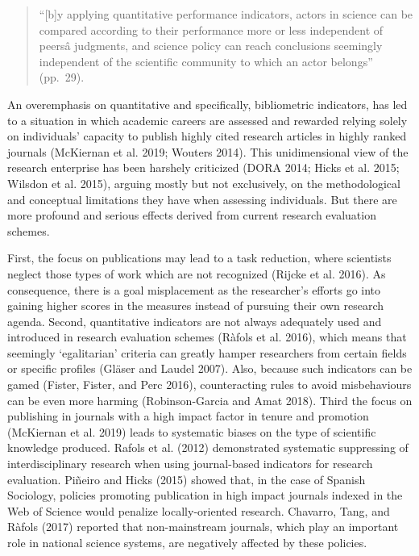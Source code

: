 \documentclass[]{elsarticle} %
\begin{document}
\begin{quote}
``{[}b{]}y applying quantitative performance indicators, actors in
science can be compared according to their performance more or less
independent of peersâ judgments, and science policy can reach
conclusions seemingly independent of the scientific community to which
an actor belongs'' (pp.~29).
\end{quote}

An overemphasis on quantitative and specifically, bibliometric
indicators, has led to a situation in which academic careers are
assessed and rewarded relying solely on individuals' capacity to publish
highly cited research articles in highly ranked journals (McKiernan et
al. 2019; Wouters 2014). This unidimensional view of the research
enterprise has been harshely criticized (DORA 2014; Hicks et al. 2015;
Wilsdon et al. 2015), arguing mostly but not exclusively, on the
methodological and conceptual limitations they have when assessing
individuals. But there are more profound and serious effects derived
from current research evaluation schemes.

First, the focus on publications may lead to a task reduction, where
scientists neglect those types of work which are not recognized (Rijcke
et al. 2016). As consequence, there is a goal misplacement as the
researcher's efforts go into gaining higher scores in the measures
instead of pursuing their own research agenda. Second, quantitative
indicators are not always adequately used and introduced in research
evaluation schemes (Ràfols et al. 2016), which means that seemingly
`egalitarian' criteria can greatly hamper researchers from certain
fields or specific profiles (Gläser and Laudel 2007). Also, because such
indicators can be gamed (Fister, Fister, and Perc 2016), counteracting
rules to avoid misbehaviours can be even more harming (Robinson-Garcia
and Amat 2018). Third the focus on publishing in journals with a high
impact factor in tenure and promotion (McKiernan et al. 2019) leads to
systematic biases on the type of scientific knowledge produced. Rafols
et al. (2012) demonstrated systematic suppressing of interdisciplinary
research when using journal-based indicators for research evaluation.
Piñeiro and Hicks (2015) showed that, in the case of Spanish Sociology,
policies promoting publication in high impact journals indexed in the
Web of Science would penalize locally-oriented research. Chavarro, Tang,
and Ràfols (2017) reported that non-mainstream journals, which play an
important role in national science systems, are negatively affected by
these policies.
\end{document}
